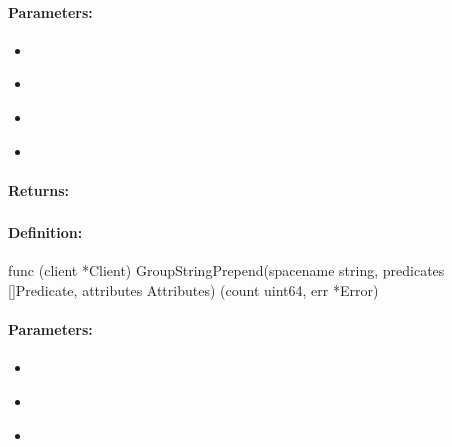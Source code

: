 \paragraph{Parameters:}
\begin{itemize}[noitemsep]
\item {}\\

\item {}\\

\item {}\\

\item {}\\

\end{itemize}

\paragraph{Returns:}


\pagebreak
\subsubsection{}
\label{api:Go:GroupStringPrepend}


\paragraph{Definition:}
\begin{gocode}
func (client *Client) GroupStringPrepend(spacename string, predicates []Predicate, attributes Attributes) (count uint64, err *Error)
\end{gocode}

\paragraph{Parameters:}
\begin{itemize}[noitemsep]
\item {}\\

\item {}\\

\item {}\\

\end{itemize}

